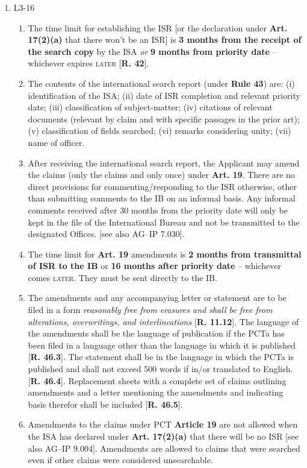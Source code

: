 \documentclass{report}
\begin{document}
\begin{enumerate}[label=\textbf{Answer \arabic*}]
    \item %
    L3-16 
    \begin{enumerate}[label=(\alph*)]
        \item The time limit for establishing the ISR [or the declaration under \textbf{Art. 17(2)(a)} that there won't be an ISR] is \textbf{3 months from the receipt of the search copy} by the ISA \textit{or} \textbf{9 months from priority date} -- whichever expires \textsc{later} [\textbf{R. 42}].
        \item The contents of the international search report (under \textbf{Rule 43}) are: (i) identification of the ISA; (ii) date of ISR completion and relevant priority date; (iii) classification of subject-matter; (iv) citations of relevant documents (relevant by claim and with specific passages in the prior art); (v) classification of fields searched; (vi) remarks considering unity; (vii) name of officer.
        \item After receiving the international search report, the Applicant may amend the claims (only the claims and only once) under \textbf{Art. 19}. There are no direct provisions for commenting/responding to the ISR otherwise, other than submitting comments to the IB on an informal basis. Any informal comments received after 30 months from the priority date will only be kept in the file of the International Bureau and not be transmitted to the designated Offices. [see also \textsc{AG--IP 7.030}].
        \item The time limit for \textbf{Art. 19} amendments is \textbf{2 months from transmittal of ISR to the IB} or \textbf{16 months after priority date} -- whichever comes \textsc{later}. They must be sent directly to the IB.
        \item The amendments and any accompanying letter or statement are to be filed in a form \textit{reasonably free from erasures and shall be free from alterations, overwritings, and interlineations} [\textbf{R. 11.12}]. The language of the amendments shall be the language of publication if the PCTa has been filed in a language other than the language in which it is published [\textbf{R. 46.3}]. The statement shall be in the language in which the PCTa is published and shall not exceed 500 words if in/or translated to English.    [\textbf{R. 46.4}]. Replacement sheets with a complete set of claims outlining amendments and a letter mentioning the amendments and indicating basis therefor shall be included [\textbf{R. 46.5}].
        \item Amendments to the claims under PCT \textbf{Article 19} are not allowed when the ISA has declared under \textbf{Art. 17(2)(a)} that there will be no ISR [see also \textsc{AG--IP 9.004}]. Amendments are allowed to claims that were searched even if other claims were considered unsearchable.
    \end{enumerate}


\end{enumerate}
\end{document}
